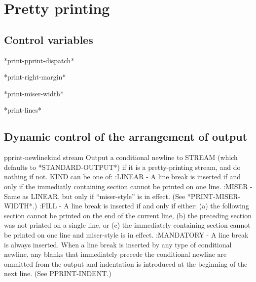 \documentclass[10pt,english]{book}
\begin{document}

\chapter{Pretty printing}
\label{cha:pretty-printing}

\section{Control variables}
\label{sec:control-variables}

\begin{variable}{*print-pprint-dispatch*}{}
  
\end{variable}

\begin{variable}{*print-right-margin*}{}
  
\end{variable}

\begin{variable}{*print-miser-width*}{}
  
\end{variable}

\begin{variable}{*print-lines*}{}
  
\end{variable}

\section{Dynamic control of the arrangement of output}
\label{sec:dynam-contr-arrang}

\begin{function}{pprint-newline}{kind \op stream}
  Output a conditional newline to STREAM (which defaults to
   *STANDARD-OUTPUT*) if it is a pretty-printing stream, and do
   nothing if not. KIND can be one of:
     :LINEAR - A line break is inserted if and only if the immediatly
        containing section cannot be printed on one line.
     :MISER - Same as LINEAR, but only if ``miser-style'' is in effect.
        (See *PRINT-MISER-WIDTH*.)
     :FILL - A line break is inserted if and only if either:
       (a) the following section cannot be printed on the end of the
           current line,
       (b) the preceding section was not printed on a single line, or
       (c) the immediately containing section cannot be printed on one
           line and miser-style is in effect.
     :MANDATORY - A line break is always inserted.
   When a line break is inserted by any type of conditional newline, any
   blanks that immediately precede the conditional newline are ommitted
   from the output and indentation is introduced at the beginning of the
   next line. (See PPRINT-INDENT.)
\end{function}
\end{document}

